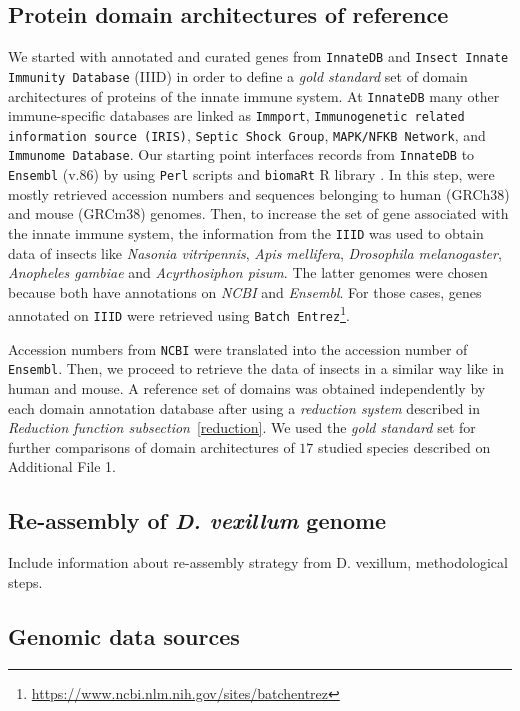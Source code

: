 \documentclass[11pt]{article}
\newcommand{\TODO}[1]{\begingroup\color{red}#1\endgroup}
\begin{document}
\subsection*{Protein domain architectures of reference}
We started with annotated and curated genes from \texttt{InnateDB} 
\cite{Breuer01012013} and \texttt{Insect Innate Immunity Database} (IIID) 
\cite{Brucker2012} in order to define a \textsl{gold standard} set of domain 
architectures of proteins of the innate immune system. At \texttt{InnateDB} many 
other immune-specific databases are linked as \texttt{Immport}, 
\texttt{Immunogenetic related information source (IRIS)}, \texttt{Septic Shock 
Group}, \texttt{MAPK/NFKB Network}, and \texttt{Immunome Database}. Our starting 
point interfaces records from \texttt{InnateDB} to \texttt{Ensembl} (v.86) 
by using \texttt{Perl} scripts and \texttt{biomaRt} R library 
\cite{Durinck:2009aa}. In this step, were mostly retrieved accession numbers 
and sequences belonging to human (GRCh38) and mouse (GRCm38) genomes. Then, to 
increase the set of gene associated with the innate immune system, the 
information from the \texttt{IIID} was used to obtain data of insects like 
\textsl{Nasonia vitripennis}, \textsl{Apis mellifera}, \textsl{Drosophila 
melanogaster}, \textsl{Anopheles gambiae} and \textsl{Acyrthosiphon pisum}. The 
latter genomes were chosen because both have annotations on \textsl{NCBI} and 
\textsl{Ensembl}. For those cases, genes annotated on \texttt{IIID} were retrieved using \texttt{Batch Entrez}\footnote{\url{https://www.ncbi.nlm.nih.gov/sites/batchentrez}}. 

Accession numbers from \texttt{NCBI} were translated into the accession number 
of \texttt{Ensembl}. Then, we proceed to retrieve the data of insects in a 
similar way like in human and mouse. A reference set of domains was obtained 
independently by each domain annotation database after using a \textsl{reduction 
system} described in \textsl{Reduction function subsection}~\ref{reduction}. We 
used the \textsl{gold standard} set for further comparisons of domain 
architectures of $17$ studied species described on Additional File 1.

\subsection*{Re-assembly of \textit{D. vexillum} genome}
\TODO{Include information about re-assembly strategy from D. vexillum, 
methodological steps.}

\subsection*{Genomic data sources}
\end{document}
